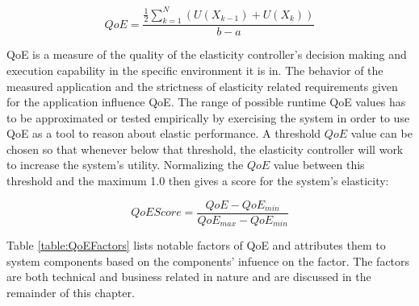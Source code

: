 \documentclass[english]{tktltiki2}
\theoremstyle{definition}
\theoremstyle{remark}
\begin{document}
\begin{equation}
QoE = \frac{\frac{1}{2}\sum\limits_{k=1}^N (U(X_{k-1}) + U(X_{k}))}{b-a} 
\label{eq:qoefunctionnumericalfinal}
\end{equation}

QoE is a measure of the quality of the elasticity controller's decision making
and execution capability in the specific environment it is in. The behavior of
the measured application and the strictness of elasticity related requirements
given for the application influence QoE. The range of possible runtime QoE
values has to be approximated or tested empirically by exercising the system in
order to use QoE as a tool to reason about elastic performance. A threshold
$QoE$ value can be chosen so that whenever below that threshold, the elasticity
controller will work to increase the system's utility. Normalizing the $QoE$
value between this threshold and the maximum 1.0 then gives a score for the
system's elasticity:

\begin{equation}
	QoEScore = \frac{QoE - QoE_{min}}{QoE_{max} - QoE_{min}} 
	\label{eq:qoeScore}
\end{equation}

Table
\ref{table:QoEFactors} lists notable factors of QoE and attributes them to system
components based on the components' infuence on the factor. The factors are both
technical and business related in nature and are discussed in the remainder of
this chapter.

	\begin{table}[h]
	    \caption{QoE factors and the system components which can affect them.}
	    \label{table:QoEFactors}

	\end{table}
\end{document}
